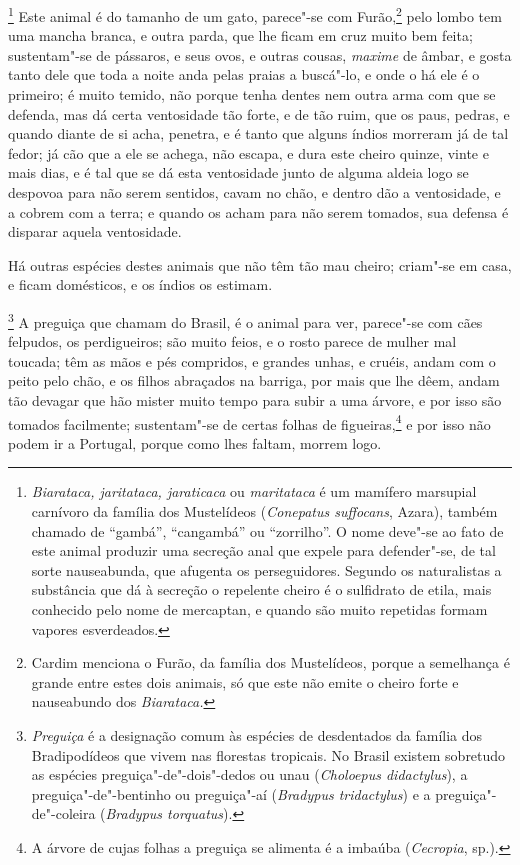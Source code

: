 \footnote{ \textit{Biarataca, jaritataca,
jaraticaca} ou \textit{maritataca} é um mamífero marsupial carnívoro
da família dos Mustelídeos (\textit{Conepatus suffocans}, Azara),
também chamado de ``gambá'', ``cangambá'' ou ``zorrilho''. O nome deve"-se ao
fato de este animal produzir uma secreção anal que expele para
defender"-se, de tal sorte nauseabunda, que afugenta os perseguidores.
Segundo os naturalistas a substância que dá à secreção o repelente
cheiro é o sulfidrato de etila, mais conhecido pelo nome de mercaptan,
e quando são muito repetidas formam vapores esverdeados.} Este animal é 
do tamanho de um gato, parece"-se com Furão,\footnote{ Cardim menciona o 
Furão, da família dos Mustelídeos, porque a
semelhança é grande entre estes dois animais, só que este não emite o
cheiro forte e nauseabundo dos \textit{Biarataca.}} pelo lombo tem uma
mancha branca, e outra parda, que lhe ficam em cruz muito bem feita;
sustentam"-se de pássaros, e seus ovos, e outras cousas, \textit{maxime}
de âmbar, e gosta tanto dele que toda a noite anda pelas praias a
buscá"-lo, e onde o há ele é o primeiro; é muito temido, não
porque tenha dentes nem outra arma com que se defenda, mas dá certa
ventosidade tão forte, e de tão ruim, que os paus, pedras, e quando
diante de si acha, penetra, e é tanto que alguns índios morreram já de
tal fedor; já cão que a ele se achega, não escapa, e dura este cheiro
quinze, vinte e mais dias, e é tal que se dá esta ventosidade junto de
alguma aldeia logo se despovoa para não serem sentidos, cavam no chão,
e dentro dão a ventosidade, e a cobrem com a terra; e quando os acham
para não serem tomados, sua defensa é disparar aquela ventosidade.

 Há outras espécies destes animais que não têm tão mau cheiro; criam"-se
em casa, e ficam domésticos, e os índios os estimam.

\footnote{ \textit{Preguiça} é a designação
comum às espécies de desdentados da família dos Bradipodídeos que vivem
nas florestas tropicais. No Brasil existem sobretudo as espécies
preguiça"-de"-dois"-dedos ou unau (\textit{Choloepus didactylus}), a
preguiça"-de"-bentinho ou preguiça"-aí (\textit{Bradypus tridactylus}) e a
preguiça"-de"-coleira (\textit{Bradypus torquatus}).} A
preguiça que chamam do Brasil, é o animal para ver, parece"-se com cães
felpudos, os perdigueiros; são muito feios, e o rosto parece de mulher
mal toucada; têm as mãos e pés compridos, e grandes unhas, e cruéis,
andam com o peito pelo chão, e os filhos abraçados na barriga, por mais
que lhe dêem, andam tão devagar que hão mister muito tempo para subir a
uma árvore, e por isso são tomados facilmente; sustentam"-se de certas
folhas de figueiras,\footnote{ A árvore de cujas folhas a preguiça
se alimenta é a imbaúba (\textit{Cecropia}, sp.).} e por isso não
podem ir a Portugal, porque como lhes faltam, morrem logo.

